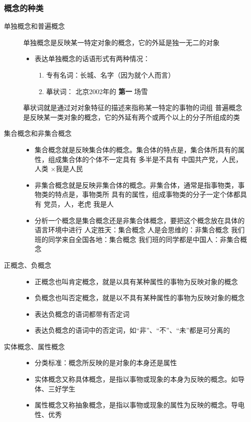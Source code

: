 \documentclass[11pt]{article}
\begin{document}
\subsubsection{概念的种类}
\label{sec-3-1-3}
\begin{description}
\item[{单独概念和普遍概念}] 单独概念是反映某一特定对象的概念，它的外延是独一无二的对象
\begin{itemize}
\item 表达单独概念的话语形式有两种情况：
\begin{enumerate}
\item 专有名词：长城、名字（因为就个人而言）
\item 摹状词： 北京2002年的 \textbf{第一} 场雪
\end{enumerate}
\end{itemize}
摹状词就是通过对对象特征的描述来指称某一特定的事物的词组
普遍概念是反映某一类对象的概念，它的外延有两个或两个以上的分子所组成的类
\item[{集合概念和非集合概念}] \begin{itemize}
\item 集合概念就是反映集合体的概念。集合体的特点是，集合体所具有的属性，组成集合体的个体不一定具有
多半是不具有
中国共产党，人民，人类
×我是人民
\item 非集合概念就是反映非集合体的概念。非集合体，通常是指事物类，事物类的特点是，事物类所
具有的属性，组成事物类的分子一定个体都具有
党员，人，老虎
我是人
\item 分析一个概念是集合概念还是非集合体概念，要把这个概念放在具体的语言环境中进行
人定胜天：集合概念
人是会思维的：非集合概念
我们班的同学来自全国各地：集合概念
我们班的同学都是中国人：非集合概念
\end{itemize}
\item[{正概念、负概念}] \begin{itemize}
\item 正概念也叫肯定概念，就是以具有某种属性的事物为反映对象的概念
\item 负概念也叫否定概念，就是以不具有某种属性的事物为反映对象的概念
\item 表达负概念的语词都带有否定词
\item 表达负概念的语词中的否定词，如“非”、“不”、“未”都是可分离的
\end{itemize}
\item[{实体概念、属性概念}] \begin{itemize}
\item 分类标准：概念所反映的是对象的本身还是属性
\item 实体概念又称具体概念，是指以事物或现象的本身为反映的概念。如导体、三好学生
\item 属性概念又称抽象概念，是指以事物或现象的属性为反映的概念。导电性、优秀
\end{itemize}
\end{description}
\end{document}
